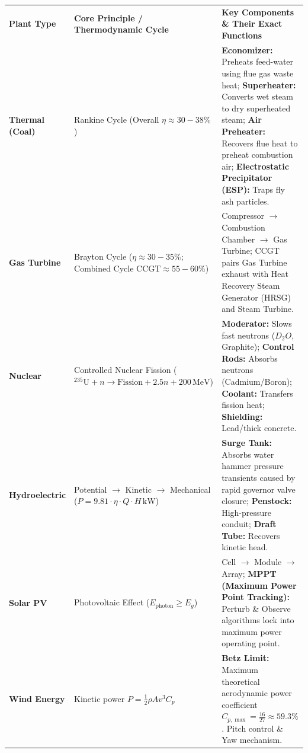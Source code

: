 \documentclass[10pt,a4paper]{article}
\begin{document}
\begin{center}
\scriptsize
\begin{tabularx}{\textwidth}{L{2.2cm} L{4.5cm} X}
  \color{white}\textbf{Plant Type} & \color{white}\textbf{Core Principle / Thermodynamic Cycle} & \color{white}\textbf{Key Components \& Their Exact Functions} \\
   \textbf{Thermal (Coal)} & Rankine Cycle (Overall $\eta \approx 30-38\%$) & \textbf{Economizer:} Preheats feed-water using flue gas waste heat; \textbf{Superheater:} Converts wet steam to dry superheated steam; \textbf{Air Preheater:} Recovers flue heat to preheat combustion air; \textbf{Electrostatic Precipitator (ESP):} Traps fly ash particles. \\
  \textbf{Gas Turbine} & Brayton Cycle ($\eta \approx 30-35\%$; Combined Cycle $\text{CCGT} \approx 55-60\%$) & Compressor $\to$ Combustion Chamber $\to$ Gas Turbine; CCGT pairs Gas Turbine exhaust with Heat Recovery Steam Generator (HRSG) and Steam Turbine. \\
   \textbf{Nuclear} & Controlled Nuclear Fission ($^{235}\text{U} + n \to \text{Fission} + 2.5n + 200\,\text{MeV}$) & \textbf{Moderator:} Slows fast neutrons ($D_2O$, Graphite); \textbf{Control Rods:} Absorbs neutrons (Cadmium/Boron); \textbf{Coolant:} Transfers fission heat; \textbf{Shielding:} Lead/thick concrete. \\
  \textbf{Hydroelectric} & Potential $\to$ Kinetic $\to$ Mechanical ($P = 9.81 \cdot \eta \cdot Q \cdot H\,\text{kW}$) & \textbf{Surge Tank:} Absorbs water hammer pressure transients caused by rapid governor valve closure; \textbf{Penstock:} High-pressure conduit; \textbf{Draft Tube:} Recovers kinetic head. \\
   \textbf{Solar PV} & Photovoltaic Effect ($E_{\text{photon}} \ge E_g$) & Cell $\to$ Module $\to$ Array; \textbf{MPPT (Maximum Power Point Tracking):} Perturb \& Observe algorithms lock into maximum power operating point. \\
  \textbf{Wind Energy} & Kinetic power $P = \frac{1}{2} \rho A v^3 C_p$ & \textbf{Betz Limit:} Maximum theoretical aerodynamic power coefficient $C_{p,\max} = \frac{16}{27} \approx 59.3\%$. Pitch control \& Yaw mechanism. \\
\end{tabularx}
\end{center}
\end{document}
